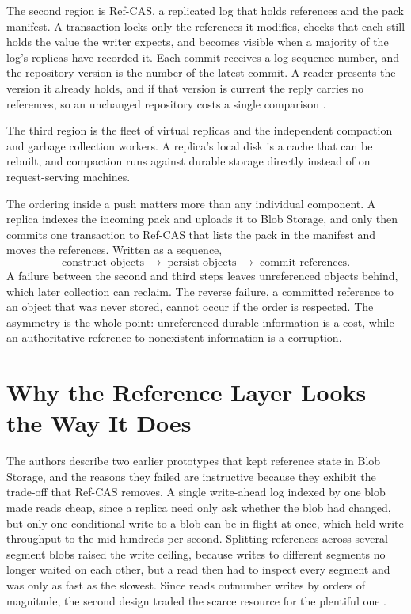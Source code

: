 \documentclass[11pt]{article}
\theoremstyle{definition}
\theoremstyle{plain}
\begin{document}
The second region is Ref-CAS, a replicated log that holds references and the pack manifest. A transaction locks only the references it modifies, checks that each still holds the value the writer expects, and becomes visible when a majority of the log's replicas have recorded it. Each commit receives a log sequence number, and the repository version is the number of the latest commit. A reader presents the version it already holds, and if that version is current the reply carries no references, so an unchanged repository costs a single comparison \cite{raman2026}.

The third region is the fleet of virtual replicas and the independent compaction and garbage collection workers. A replica's local disk is a cache that can be rebuilt, and compaction runs against durable storage directly instead of on request-serving machines.

The ordering inside a push matters more than any individual component. A replica indexes the incoming pack and uploads it to Blob Storage, and only then commits one transaction to Ref-CAS that lists the pack in the manifest and moves the references. Written as a sequence,
\[
\text{construct objects}\;\longrightarrow\;\text{persist objects}\;\longrightarrow\;\text{commit references}.
\]
A failure between the second and third steps leaves unreferenced objects behind, which later collection can reclaim. The reverse failure, a committed reference to an object that was never stored, cannot occur if the order is respected. The asymmetry is the whole point: unreferenced durable information is a cost, while an authoritative reference to nonexistent information is a corruption.

\section{Why the Reference Layer Looks the Way It Does}

The authors describe two earlier prototypes that kept reference state in Blob Storage, and the reasons they failed are instructive because they exhibit the trade-off that Ref-CAS removes. A single write-ahead log indexed by one blob made reads cheap, since a replica need only ask whether the blob had changed, but only one conditional write to a blob can be in flight at once, which held write throughput to the mid-hundreds per second. Splitting references across several segment blobs raised the write ceiling, because writes to different segments no longer waited on each other, but a read then had to inspect every segment and was only as fast as the slowest. Since reads outnumber writes by orders of magnitude, the second design traded the scarce resource for the plentiful one \cite{raman2026}.
\end{document}
